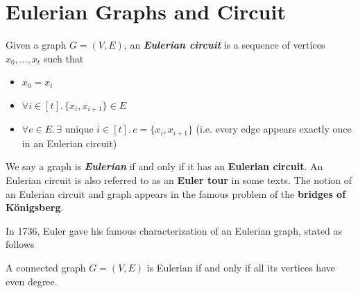\section{Eulerian Graphs and Circuit}

\begin{definition}
    Given a graph $G = (V,E)$, an \textit{\textbf{Eulerian circuit}} is a sequence of vertices $x_0,\ldots,x_t$ such that
    \begin{itemize}
        \item $x_0 = x_t$ 
        \item $\forall i \in [t].\, \{x_i, x_{i+1}\} \in E$ 
        \item $\forall e \in E.\, \exists \text{ unique $i \in [t]$.}\, e = \{x_i, x_{i+1}\}$ (i.e. every edge appears exactly once in an Eulerian circuit)
    \end{itemize}
\end{definition}

We say a graph is \textit{\textbf{Eulerian}} if and only if it has an \textbf{Eulerian circuit}. An Eulerian circuit is also referred to as an \textbf{Euler tour} in some texts. The notion of an Eulerian circuit and graph appears in the famous problem of the \textbf{bridges of K\"onigsberg}.

In 1736, Euler gave his famous characterization of an Eulerian graph, stated as follows

\begin{theorem}[Euler, 1736]
    A connected graph $G = (V,E)$ is Eulerian if and only if all its vertices have even degree.
\end{theorem}

